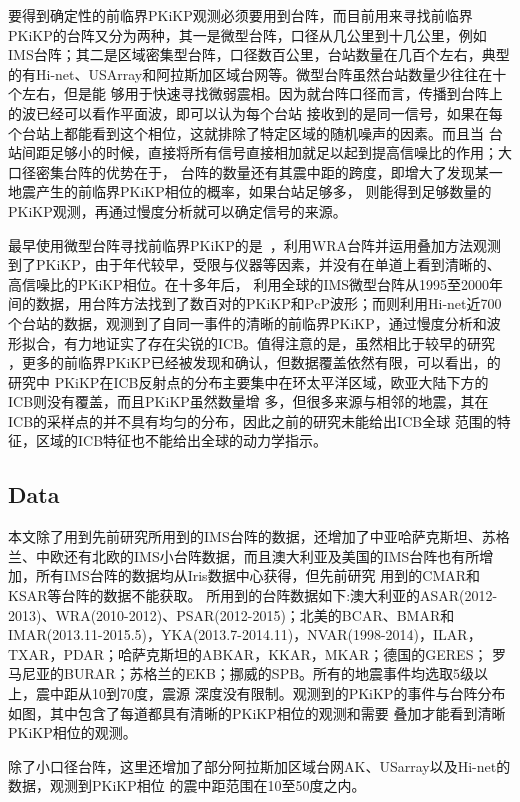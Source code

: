 要得到确定性的前临界PKiKP观测必须要用到台阵，而目前用来寻找前临界PKiKP的台阵又分为两种，其一是微型台阵，口径从几公里到十几公里，例如IMS台阵；其二是区域密集型台阵，口径数百公里，台站数量在几百个左右，典型的有Hi-net、USArray和阿拉斯加区域台网等。微型台阵虽然台站数量少往往在十个左右，但是能
够用于快速寻找微弱震相。因为就台阵口径而言，传播到台阵上的波已经可以看作平面波，即可以认为每个台站
接收到的是同一信号，如果在每个台站上都能看到这个相位，这就排除了特定区域的随机噪声的因素。而且当
台站间距足够小的时候，直接将所有信号直接相加就足以起到提高信噪比的作用；大口径密集台阵的优势在于， 台阵的数量还有其震中距的跨度，即增大了发现某一地震产生的前临界PKiKP相位的概率，如果台站足够多，
则能得到足够数量的PKiKP观测，再通过慢度分析就可以确定信号的来源。

最早使用微型台阵寻找前临界PKiKP的是~\cite{Souriau1989}，利用WRA台阵并运用叠加方法观测到了PKiKP，由于年代较早，受限与仪器等因素，并没有在单道上看到清晰的、高信噪比的PKiKP相位。在十多年后，
\cite{Koper2003}利用全球的IMS微型台阵从1995至2000年间的数据，用台阵方法找到了数百对的PKiKP和PcP波形；而\cite{Kawakatsu2006}则利用Hi-net近700个台站的数据，观测到了自同一事件的清晰的前临界PKiKP，通过慢度分析和波形拟合，有力地证实了存在尖锐的ICB。值得注意的是，虽然相比于较早的研究
，更多的前临界PKiKP已经被发现和确认，但数据覆盖依然有限，可以看出，\cite{Koper2003}的研究中
PKiKP在ICB反射点的分布主要集中在环太平洋区域，欧亚大陆下方的ICB则没有覆盖，而且PKiKP虽然数量增
多，但很多来源与相邻的地震，其在ICB的采样点的并不具有均匀的分布，因此之前的研究未能给出ICB全球
范围的特征，区域的ICB特征也不能给出全球的动力学指示。

\subsection{Data}

本文除了用到先前研究所用到的IMS台阵的数据，还增加了中亚哈萨克斯坦、苏格兰、中欧还有北欧的IMS小台阵数据，而且澳大利亚及美国的IMS台阵也有所增加，所有IMS台阵的数据均从Iris数据中心获得，但先前研究
用到的CMAR和KSAR等台阵的数据不能获取。
所用到的台阵数据如下:澳大利亚的ASAR(2012-2013)、WRA(2010-2012)、PSAR(2012-2015)；北美的BCAR、BMAR和IMAR(2013.11-2015.5)，YKA(2013.7-2014.11)，NVAR(1998-2014)，ILAR，TXAR，PDAR；哈萨克斯坦的ABKAR，KKAR，MKAR；德国的GERES；
罗马尼亚的BURAR；苏格兰的EKB；挪威的SPB。所有的地震事件均选取5级以上，震中距从10到70度，震源
深度没有限制。观测到的PKiKP的事件与台阵分布如图，其中包含了每道都具有清晰的PKiKP相位的观测和需要
叠加才能看到清晰PKiKP相位的观测。

除了小口径台阵，这里还增加了部分阿拉斯加区域台网AK、USarray以及Hi-net的数据，观测到PKiKP相位
的震中距范围在10至50度之内。

